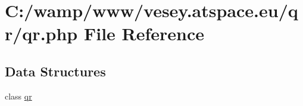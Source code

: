\hypertarget{qr_8php}{\section{C\-:/wamp/www/vesey.atspace.\-eu/qr/qr.php File Reference}
\label{qr_8php}
}
\subsection*{Data Structures}
\begin{DoxyCompactItemize}
\item 
class \hyperlink{classqr}{qr}
\end{DoxyCompactItemize}
